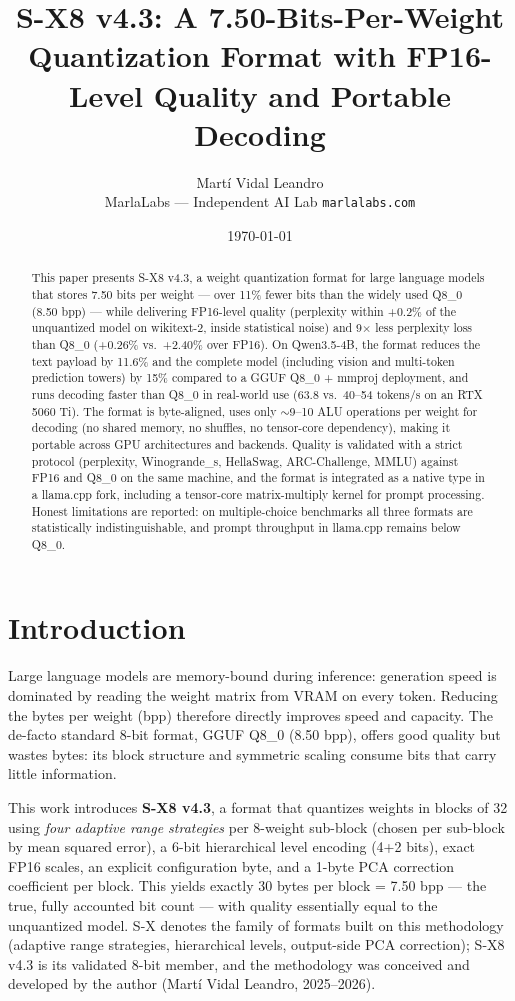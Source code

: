 \documentclass[11pt]{article}
\title{\textbf{S-X8 v4.3: A 7.50-Bits-Per-Weight Quantization Format with FP16-Level Quality and Portable Decoding}}
\author{Mart\'i Vidal Leandro\\[2pt] {\small MarlaLabs --- Independent AI Lab \texttt{marlalabs.com}}}
\date{\today}
\begin{document}
\maketitle

\begin{abstract}
This paper presents S-X8 v4.3, a weight quantization format for large language models that stores 7.50 bits per
weight --- over 11\% fewer bits than the widely used Q8\_0 (8.50 bpp) --- while delivering FP16-level
quality (perplexity within +0.2\% of the unquantized model on wikitext-2, inside statistical noise) and
9$\times$ less perplexity loss than Q8\_0 (+0.26\% vs.\ +2.40\% over FP16). On Qwen3.5-4B, the format
reduces the text payload by 11.6\% and the complete model (including vision and multi-token prediction
towers) by 15\% compared to a GGUF Q8\_0 + mmproj deployment, and runs decoding faster than Q8\_0 in
real-world use (63.8 vs.\ 40--54 tokens/s on an RTX 5060 Ti). The format is byte-aligned, uses only
$\sim$9--10 ALU operations per weight for decoding (no shared memory, no shuffles, no tensor-core
dependency), making it portable across GPU architectures and backends. Quality is validated with a strict
protocol (perplexity, Winogrande\_s, HellaSwag, ARC-Challenge, MMLU) against FP16 and Q8\_0 on the same
machine, and the format is integrated as a native type in a llama.cpp fork, including a tensor-core
matrix-multiply kernel for prompt processing. Honest limitations are reported: on multiple-choice
benchmarks all three formats are statistically indistinguishable, and prompt throughput in llama.cpp
remains below Q8\_0.
\end{abstract}

\section{Introduction}
Large language models are memory-bound during inference: generation speed is dominated by reading the
weight matrix from VRAM on every token. Reducing the bytes per weight (bpp) therefore directly improves
speed and capacity. The de-facto standard 8-bit format, GGUF Q8\_0 (8.50 bpp), offers good quality but
wastes bytes: its block structure and symmetric scaling consume bits that carry little information.

This work introduces \textbf{S-X8 v4.3}, a format that quantizes weights in blocks of 32 using \emph{four adaptive
range strategies} per 8-weight sub-block (chosen per sub-block by mean squared error), a 6-bit hierarchical
level encoding (4+2 bits), exact FP16 scales, an explicit configuration byte, and a 1-byte PCA correction
coefficient per block. This yields exactly 30 bytes per block = 7.50 bpp --- the true, fully accounted bit
count --- with quality essentially equal to the unquantized model. S-X denotes the family of formats
built on this methodology (adaptive range strategies, hierarchical levels, output-side PCA correction);
S-X8 v4.3 is its validated 8-bit member, and the methodology was conceived and developed by the author
(Mart\'i Vidal Leandro, 2025--2026).
\end{document}
